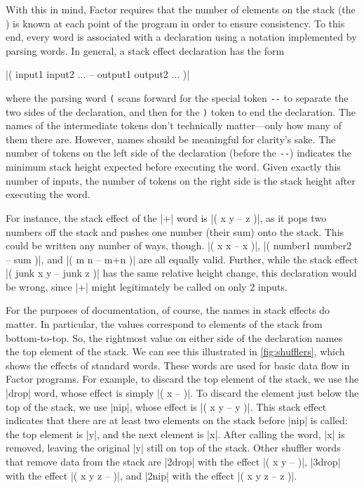 With this in mind, Factor requires that the number of elements on the stack
(the ) is known at each point of the program in order to
ensure consistency.  To this end, every word is associated with a  declaration using a notation implemented by parsing words.  In general,
a stack effect declaration has the form
%
\begin{center}
  \factor|( input1 input2 ... -- output1 output2 ... )|
\end{center}
%
where the parsing word \Verb|(| scans forward for the special token \Verb|--|
to separate the two sides of the declaration, and then for the \Verb|)| token
to end the declaration.  The names of the intermediate tokens don't technically
matter---only how many of them there are.  However, names should be meaningful
for clarity's sake.  The number of tokens on the left side of the declaration
(before the \Verb|--|) indicates the minimum stack height expected before
executing the word.  Given exactly this number of inputs, the number of tokens
on the right side is the stack height after executing the word.

For instance, the stack effect of the \factor|+| word is
%
\factor|( x y -- z )|,
%
as it pops two numbers off the stack and pushes one number (their sum) onto the
stack.  This could be written any number of ways, though.
%
\factor|( x x -- x )|,
%
\factor|( number1 number2 -- sum )|,
%
and
%
\factor|( m n -- m+n )|
%
are all equally valid.  Further, while the stack effect
%
\factor|( junk x y -- junk z )|
%
has the same relative height change, this declaration would be wrong, since
\factor|+| might legitimately be called on only $2$ inputs.


For the purposes of documentation, of course, the names in stack effects do
matter.  In particular, the values correspond to elements of the stack from
bottom-to-top.  So, the rightmost value on either side of the declaration names
the top element of the stack.  We can see this illustrated in
\vref{fig:shufflers}, which shows the effects of standard 
words.  These words are used for basic data flow in Factor programs.  For
example, to discard the top element of the stack, we use the \factor|drop|
word, whose effect is simply
%
\factor|( x -- )|.
%
To discard the element just below the top of the stack, we use \factor|nip|,
whose effect is
%
\factor|( x y -- y )|.
%
This stack effect indicates that there are at least two elements on the stack
before \factor|nip| is called: the top element is \factor|y|, and the next
element is \factor|x|.  After calling the word, \factor|x| is removed, leaving
the original \factor|y| still on top of the stack.  Other shuffler words that
remove data from the stack are
%
\factor|2drop| with the effect \factor|( x y -- )|,
%
\factor|3drop| with the effect \factor|( x y z -- )|, and
%
\factor|2nip| with the effect \factor|( x y z -- z )|.

